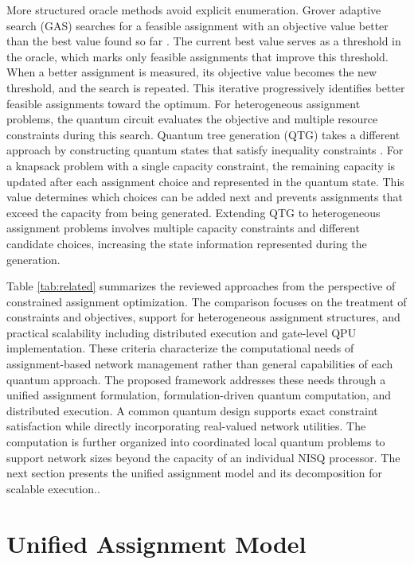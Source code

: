 \documentclass[journal]{IEEEtran}
\begin{document}
{{More structured oracle methods avoid explicit enumeration. Grover adaptive search (GAS) searches for a feasible assignment with an objective value better than the best value found so far \cite{gilliam2021gas,fujiwara2025gas}. The current best value serves as a threshold in the oracle, which marks only feasible assignments that improve this threshold. When a better assignment is measured, its objective value becomes the new threshold, and the search is repeated. This iterative progressively identifies better feasible assignments toward the optimum. For heterogeneous assignment problems, the quantum circuit evaluates the objective and multiple resource constraints during this search.
Quantum tree generation (QTG) takes a different approach by constructing quantum states that satisfy inequality constraints \cite{wilkening2025qtg,wilkening2025qkp}. For a knapsack problem with a single capacity constraint, the remaining capacity is updated after each assignment choice and represented in the quantum state. This value
determines which choices can be added next and prevents assignments that exceed the capacity from being generated.
Extending QTG to heterogeneous assignment problems involves multiple capacity constraints and different candidate choices, increasing the state information represented during the generation. 

Table \ref{tab:related} summarizes the reviewed approaches from the perspective of constrained assignment optimization. The comparison focuses on the treatment of constraints and objectives, support for heterogeneous
assignment structures, and practical scalability including distributed execution and gate-level QPU implementation. These criteria characterize the computational needs of assignment-based network management rather than general capabilities of each quantum approach.
The proposed framework addresses these needs through a unified assignment formulation, formulation-driven quantum computation, and distributed execution. A common quantum design supports exact constraint satisfaction while directly incorporating real-valued network utilities. The computation is further organized into coordinated local quantum problems to support network sizes beyond the capacity of an individual NISQ processor. The next section presents the unified assignment model and its decomposition for scalable execution..

\section{Unified Assignment Model}
\label{sec:formulation}

}}
\end{document}
